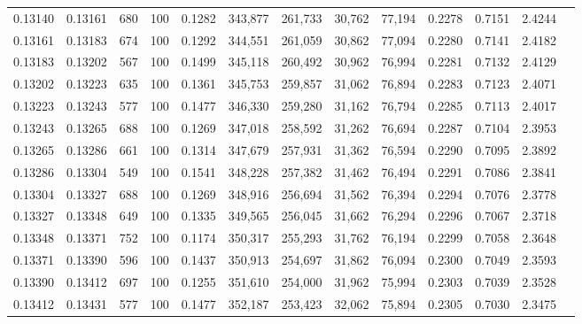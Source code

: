 \begin{tabular}{rrrrrrrrrrrrr}
0.13140 & 0.13161 &   680 & 100 &                                     0.1282 & 343,877 & 261,733 &  30,762 &  77,194 & 0.2278 & 0.7151 & 2.4244 \\
0.13161 & 0.13183 &   674 & 100 &                                     0.1292 & 344,551 & 261,059 &  30,862 &  77,094 & 0.2280 & 0.7141 & 2.4182 \\
0.13183 & 0.13202 &   567 & 100 &                                     0.1499 & 345,118 & 260,492 &  30,962 &  76,994 & 0.2281 & 0.7132 & 2.4129 \\
0.13202 & 0.13223 &   635 & 100 &                                     0.1361 & 345,753 & 259,857 &  31,062 &  76,894 & 0.2283 & 0.7123 & 2.4071 \\
0.13223 & 0.13243 &   577 & 100 &                                     0.1477 & 346,330 & 259,280 &  31,162 &  76,794 & 0.2285 & 0.7113 & 2.4017 \\
0.13243 & 0.13265 &   688 & 100 &                                     0.1269 & 347,018 & 258,592 &  31,262 &  76,694 & 0.2287 & 0.7104 & 2.3953 \\
0.13265 & 0.13286 &   661 & 100 &                                     0.1314 & 347,679 & 257,931 &  31,362 &  76,594 & 0.2290 & 0.7095 & 2.3892 \\
0.13286 & 0.13304 &   549 & 100 &                                     0.1541 & 348,228 & 257,382 &  31,462 &  76,494 & 0.2291 & 0.7086 & 2.3841 \\
0.13304 & 0.13327 &   688 & 100 &                                     0.1269 & 348,916 & 256,694 &  31,562 &  76,394 & 0.2294 & 0.7076 & 2.3778 \\
0.13327 & 0.13348 &   649 & 100 &                                     0.1335 & 349,565 & 256,045 &  31,662 &  76,294 & 0.2296 & 0.7067 & 2.3718 \\
0.13348 & 0.13371 &   752 & 100 &                                     0.1174 & 350,317 & 255,293 &  31,762 &  76,194 & 0.2299 & 0.7058 & 2.3648 \\
0.13371 & 0.13390 &   596 & 100 &                                     0.1437 & 350,913 & 254,697 &  31,862 &  76,094 & 0.2300 & 0.7049 & 2.3593 \\
0.13390 & 0.13412 &   697 & 100 &                                     0.1255 & 351,610 & 254,000 &  31,962 &  75,994 & 0.2303 & 0.7039 & 2.3528 \\
0.13412 & 0.13431 &   577 & 100 &                                     0.1477 & 352,187 & 253,423 &  32,062 &  75,894 & 0.2305 & 0.7030 & 2.3475 \\

\end{tabular}
